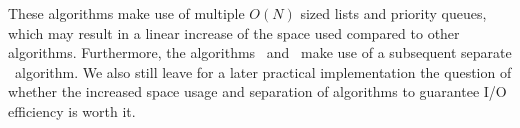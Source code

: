 

These algorithms make use of multiple $O(N)$ sized lists and priority queues,
which may result in a linear increase of the space used compared to other
algorithms. Furthermore, the algorithms \Restrict\ and \Apply\ make use of a
subsequent separate \Reduce\ algorithm. We also still leave for a later
practical implementation the question of whether the increased space usage and
separation of algorithms to guarantee I/O efficiency is worth it.



